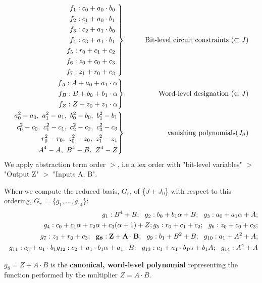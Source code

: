 \begin{Example}
\begin{eqnarray}
 \left .  
	\begin{aligned}
		f_1:c_0+a_0 \cdot b_0  \\
		f_2:c_1+a_0 \cdot b_1  \\
		f_3:c_2+a_1 \cdot b_0  \\
		f_4:c_3+a_1 \cdot b_1  \\
		f_5:r_0+c_1 + c_2		\\
		f_6:z_0+c_0 + c_3		\\
		f_7:z_1+r_0 + c_3		
	\end{aligned} 
 \ \right\}
 &\qquad&  {\it  \text{Bit-level circuit constraints} ~(\subset J)} \nonumber \\
 \left . 
	\begin{aligned}
		f_{A}:A+a_0+a_1\cdot \alpha   \\ 
		f_{B}:B+b_0+b_1\cdot \alpha  \\ 
		f_{Z}:Z+z_0+z_1\cdot \alpha   
	\end{aligned} 
 \right\}
 &\qquad&  {\it  \text{Word-level designation} ~(\subset J)} \nonumber \\
  \left . 
	\begin{aligned}
		a_0^2-a_0, ~a_1^2-a_1,~b_0^2-b_0, ~b_1^2-b_1   \\ 
		c_0^2-c_0, ~c_1^2-c_1,~c_2^2-c_2, ~c_3^2-c_3  \\ 
		r_0^2-r_0, ~z_0^2-z_0,~z_1^2-z_1    \\ 
		A^4-A, ~B^4-B ,~Z^4-Z		  
	\end{aligned} 
 \right\}
 &\qquad&  {\it \text{vanishing polynomials} (J_0)} \nonumber
\end{eqnarray}
We apply abstraction term order $>$, i.e a lex order with
"bit-level variables" $>$ "Output Z" $>$ "Inputs A, B".

When we compute the reduced \Grobner basis, $G_r$, of \{$J + J_0$\} with 
respect to this ordering, $G_r$ = \{$g_1, \dots, g_{14}\}:$
\begin{align*}
g_1: B^4+B; 
~~g_2: b_0+b_1 \alpha + B; 
~~g_3: a_0+a_1 \alpha + A;  \nonumber \\
~~g_4: c_0+c_1 \alpha + c_2 \alpha + c_3(\alpha+1)+Z;
g_5: r_0+c_1+c_2; 
~~g_6: z_0+c_0+c_3; \nonumber \\
~~g_7: z_1+r_0+c_3; 
~~{\bf g_8: Z+A\cdot B};
~~g_9: b_1+B^2+B; 
~~g_{10}: a_1+A^2+A; \nonumber \\
~~g_{11}: c_3+a_1\cdot b_1
g_{12}: c_2+a_1\cdot b_1 \alpha + a_1 \cdot B; 
~~g_{13}: c_1+a_1\cdot b_1 \alpha +b_1 A; 
~~g_{14}: A^4+A  \nonumber
\end{align*}

$g_8=Z+A\cdot B$ is the {\bf canonical, word-level polynomial } 
representing the function performed by the multiplier $Z=A\cdot B$.
\end{Example}

